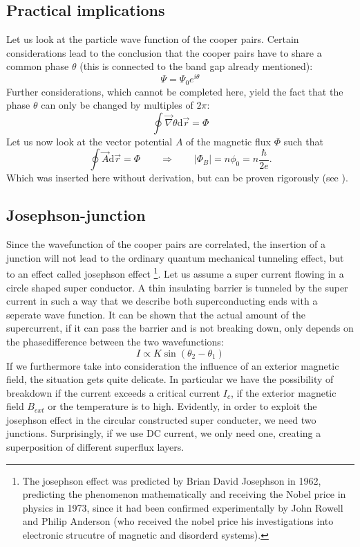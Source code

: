 \subsection{Practical implications}
Let us look at the particle wave function of the cooper pairs. Certain
considerations\cite{Landau} lead to the conclusion that the cooper pairs
have to share a common phase $\theta$ (this is connected to the band gap
already mentioned):  
\begin{equation}
\Psi = \Psi_0 e^{i\theta}
\end{equation}
Further considerations, which cannot be completed here, 
yield the fact that the phase $\theta$ can
only be changed by multiples of $2\pi$:
\begin{equation}
\oint \vec{\nabla}\theta \mathrm{d} \vec{r}  = \Phi
\end{equation}
Let us now look at the vector potential $A$ of the 
magnetic flux $\Phi$ such that 
\begin{equation}
\oint \vec{A} \mathrm{d} \vec{r}  = \Phi \qquad 
\Rightarrow \qquad |\Phi_B| = n \phi_0 = n \frac{\hbar}{2e}.
\end{equation} 
Which was inserted here without derivation, but can be proven rigorously (see \cite{Landau}).
\subsection{Josephson-junction}
Since the wavefunction of the cooper pairs are correlated, the insertion of a junction
will not lead to the ordinary quantum mechanical tunneling effect, but to an
effect called josephson effect%
\footnote{The josephson effect was predicted by Brian David Josephson in 1962, predicting
the phenomenon mathematically and receiving the Nobel price in physics in 1973, since
it had been confirmed experimentally by John Rowell and Philip Anderson (who received the
nobel price his investigations into electronic strucutre of magnetic and disorderd systems). 
}.
Let us assume a super current flowing in a circle shaped
super conductor. A thin insulating barrier is tunneled by the super current in such a way
that we describe both superconducting ends with a seperate wave function. It can be shown
that the actual amount of the supercurrent, if it can pass the barrier and is not breaking down,
only depends on the phasedifference between the two wavefunctions\cite{ver}:
\begin{equation}
I \propto K \sin(\theta_2 - \theta_1)
\end{equation}
If we furthermore take into consideration the influence of an exterior magnetic field,
the situation gets quite delicate. In particular we have the possibility of breakdown
if the current exceeds a critical current $I_c$, if the exterior magnetic field $B_{ext}$ or
the temperature is to high. Evidently, in order to exploit the josephson effect in the circular
constructed super conducter, we need two junctions. Surprisingly, if we use DC current, we only
need one, creating a superposition of different superflux layers.

